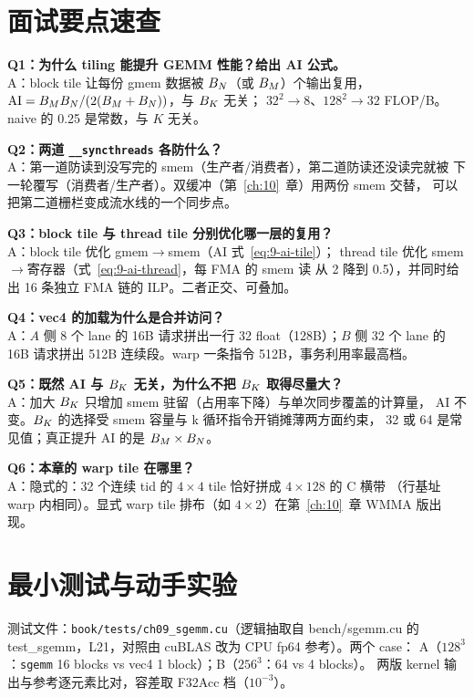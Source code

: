 \section{面试要点速查}

\textbf{Q1：为什么 tiling 能提升 GEMM 性能？给出 AI 公式。}\\
A：block tile 让每份 gmem 数据被 $B\sb{N}$（或 $B\sb{M}$）个输出复用，
$\mathrm{AI} = B\sb{M}B\sb{N} / (2(B\sb{M}+B\sb{N}))$，与 $B\sb{K}$ 无关；
$32^2 \to 8$、$128^2 \to 32$ FLOP/B。naive 的 0.25 是常数，与 $K$ 无关。

\textbf{Q2：两道 \texttt{\_\allowbreak{}\_\allowbreak{}syncthreads} 各防什么？}\\
A：第一道防读到没写完的 smem（生产者/消费者），第二道防读还没读完就被
下一轮覆写（消费者/生产者）。双缓冲（第~\ref{ch:10}~章）用两份 smem 交替，
可以把第二道栅栏变成流水线的一个同步点。

\textbf{Q3：block tile 与 thread tile 分别优化哪一层的复用？}\\
A：block tile 优化 gmem$\to$smem（AI 式~\ref{eq:9-ai-tile}）；
thread tile 优化 smem$\to$寄存器（式~\ref{eq:9-ai-thread}，每 FMA 的 smem 读
从 2 降到 0.5），并同时给出 16 条独立 FMA 链的 ILP。二者正交、可叠加。

\textbf{Q4：vec4 的加载为什么是合并访问？}\\
A：$A$ 侧 8 个 lane 的 16B 请求拼出一行 32 float（128B）；$B$ 侧 32 个 lane 的
16B 请求拼出 512B 连续段。warp 一条指令 512B，事务利用率最高档。

\textbf{Q5：既然 AI 与 $B\sb{K}$ 无关，为什么不把 $B\sb{K}$ 取得尽量大？}\\
A：加大 $B\sb{K}$ 只增加 smem 驻留（占用率下降）与单次同步覆盖的计算量，
AI 不变。$B\sb{K}$ 的选择受 smem 容量与 k 循环指令开销摊薄两方面约束，
32 或 64 是常见值；真正提升 AI 的是 $B\sb{M} \times B\sb{N}$。

\textbf{Q6：本章的 warp tile 在哪里？}\\
A：隐式的：32 个连续 tid 的 $4 \times 4$ tile 恰好拼成 $4 \times 128$ 的 C 横带
（行基址 warp 内相同）。显式 warp tile 排布（如 $4 \times 2$）在第~\ref{ch:10}~章
WMMA 版出现。

\section{最小测试与动手实验}

测试文件：\texttt{book/\allowbreak{}tests/\allowbreak{}ch09\_\allowbreak{}sgemm.\allowbreak{}cu}（逻辑抽取自 bench/sgemm.cu 的
test\_sgemm，L21，对照由 cuBLAS 改为 CPU fp64 参考）。两个 case：
A（$128^3$：\texttt{sgemm} 16 blocks vs vec4 1 block）；B（$256^3$：64 vs 4 blocks）。
两版 kernel 输出与参考逐元素比对，容差取 F32Acc 档（$10^{-3}$）。


